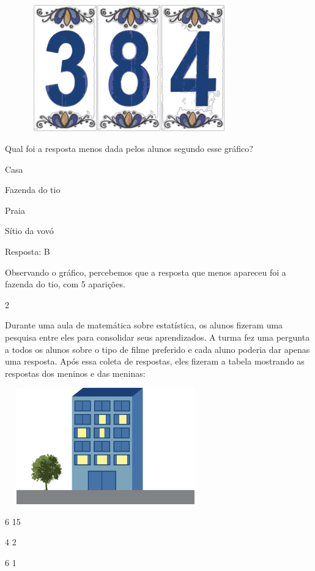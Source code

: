 \begin{escolha}
{\begin{escolha}
{\includegraphics[width=4.23077in,height=2.15071in]{media/image92.png}

Qual foi a resposta menos dada pelos alunos segundo esse gráfico?

\begin{escolha}
\item
  Casa
\item
  Fazenda do tio
\item
  Praia
\item
  Sítio da vovó
\end{escolha}

Resposta: B

Observando o gráfico, percebemos que a resposta que menos apareceu foi a
fazenda do tio, com 5 aparições.

\num{2}

Durante uma aula de matemática sobre estatística, os alunos fizeram uma
pesquisa entre eles para consolidar seus aprendizados. A turma fez uma
pergunta a todos os alunos sobre o tipo de filme preferido e cada aluno
poderia dar apenas uma resposta. Após essa coleta de respostas, eles
fizeram a tabela mostrando as respostas dos meninos e das
meninas:

\includegraphics[width=3.42308in,height=1.97646in]{media/image93.png}


6 15

4 2

6 1

}
\end{escolha}}
\end{escolha}
